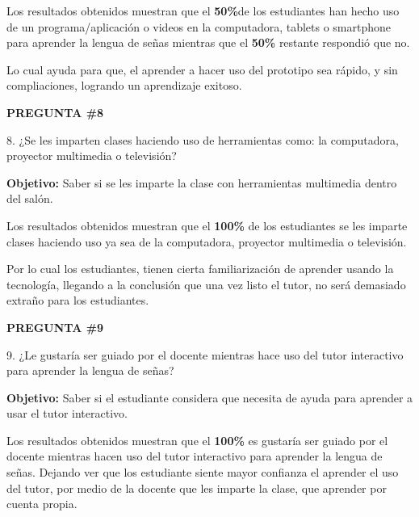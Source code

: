 \documentclass[12pt]{report}%
\begin{document}
Los resultados obtenidos muestran que el \textbf{50\%}de los estudiantes han hecho uso de un programa/aplicación o videos en la computadora, tablets o smartphone para aprender la lengua de señas mientras que el \textbf{50\%} restante respondió que no.

Lo cual ayuda para que, el aprender a hacer uso del prototipo sea rápido, y sin compliaciones, logrando un aprendizaje exitoso.

\newpage
\textbf{PREGUNTA \#8}

8. ¿Se les imparten clases haciendo uso de herramientas como: la computadora, proyector multimedia o televisión?

\textbf{Objetivo:} Saber si se les imparte la clase con herramientas multimedia dentro del salón.

\begin{center}
\end{center}

Los resultados obtenidos muestran que el \textbf{100\%} de los estudiantes se les imparte clases haciendo uso ya sea de la computadora, proyector multimedia o televisión.

Por lo cual los estudiantes, tienen cierta familiarización de aprender usando la tecnología, llegando a la conclusión que una vez listo el tutor, no será demasiado extraño para los estudiantes.

\newpage
\textbf{PREGUNTA \#9}

9. ¿Le gustaría ser guiado por el docente mientras hace uso del tutor interactivo para aprender la lengua de señas?

\textbf{Objetivo:} Saber si el estudiante considera que necesita de ayuda para aprender a usar el tutor interactivo.

\begin{center}
\end{center}

Los resultados obtenidos muestran que el \textbf{100\%} es gustaría ser guiado por el docente mientras hacen uso del tutor interactivo para aprender la lengua de señas.
Dejando ver que los estudiante siente mayor confianza el aprender el uso del tutor, por medio de la docente que les imparte la clase, que aprender por cuenta propia.
\end{document}
